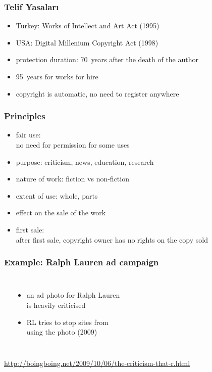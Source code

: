 \documentclass[dvipsnames]{beamer}
\theoremstyle{plain}
\begin{document}
\begin{frame}
  \frametitle{Telif Yasaları}

  \begin{itemize}
    \item Turkey: Works of Intellect and Art Act (1995)
    \item USA: Digital Millenium Copyright Act (1998)

    \medskip
    \item protection duration: 70~years after the death of the author
    \item 95~years for works for hire

    \pause
    \medskip
    \item copyright is automatic, no need to register anywhere
  \end{itemize}
\end{frame}
%

\begin{frame}
  \frametitle{Principles}

  \begin{itemize}
    \item \alert{fair use}:\\
      no need for permission for some uses
    \item purpose: criticism, news, education, research
    \item nature of work: fiction vs non-fiction
    \item extent of use: whole, parts
    \item effect on the sale of the work

    \pause
    \bigskip
    \item \alert{first sale}:\\
      after first sale, copyright owner has no rights on the copy sold
  \end{itemize}
\end{frame}

\begin{frame}
  \frametitle{Example: Ralph Lauren ad campaign}

  \begin{columns}
    \begin{center}
    \end{center}

    \begin{itemize}
      \item an ad photo for Ralph Lauren\\
        is heavily criticised
      \item RL tries to stop sites from\\
        using the photo (2009)
    \end{itemize}
  \end{columns}

  \medskip
  \tiny{\url{http://boingboing.net/2009/10/06/the-criticism-that-r.html}}\\
\end{frame}
\end{document}

